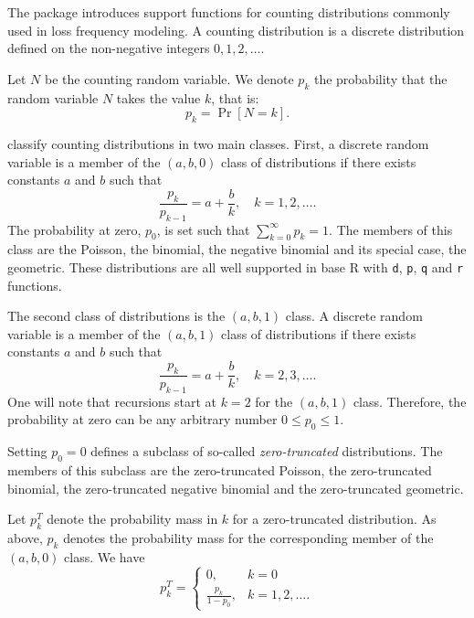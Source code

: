 \documentclass[x11names]{article}
\newcommand{\proglang}[1]{\textsf{#1}}
\newcommand{\code}[1]{\texttt{#1}}
\begin{document}
The package introduces support functions for counting distributions
commonly used in loss frequency modeling. A counting distribution is a
discrete distribution defined on the non-negative integers
$0, 1, 2, \dots$.

Let $N$ be the counting random variable. We denote $p_k$ the
probability that the random variable $N$ takes the value $k$, that is:
\begin{equation*}
  p_k = \Pr[N = k].
\end{equation*}

\citet{LossModels4e} classify counting distributions in two main
classes. First, a discrete random variable is a member of the
$(a, b, 0)$ class of distributions if there exists constants $a$ and
$b$ such that
\begin{equation*}
  \frac{p_k}{p_{k - 1}} = a + \frac{b}{k}, \quad k = 1, 2, \dots.
\end{equation*}
The probability at zero, $p_0$, is set such that
$\sum_{k = 0}^\infty p_k = 1$. The members of this class are the
Poisson, the binomial, the negative binomial and its special case, the
geometric. These distributions are all well supported in base
\proglang{R} with \code{d}, \code{p}, \code{q} and \code{r} functions.

The second class of distributions is the $(a, b, 1)$ class. A discrete
random variable is a member of the $(a, b, 1)$ class of distributions
if there exists constants $a$ and $b$ such that
\begin{equation*}
  \frac{p_k}{p_{k - 1}} = a + \frac{b}{k}, \quad k = 2, 3, \dots.
\end{equation*}
One will note that recursions start at $k = 2$ for the $(a, b, 1)$
class. Therefore, the probability at zero can be any arbitrary number
$0 \leq p_0 \leq 1$.

Setting $p_0 = 0$ defines a subclass of so-called
\emph{zero-truncated} distributions. The members of this subclass are
the zero-truncated Poisson, the zero-truncated binomial, the
zero-truncated negative binomial and the zero-truncated geometric.

Let $p_k^T$ denote the probability mass in $k$ for a zero-truncated
distribution. As above, $p_k$ denotes the probability mass for the
corresponding member of the $(a, b, 0)$ class. We have
\begin{equation*}
  p_k^T =
  \begin{cases}
    0, & k = 0 \\
    \displaystyle\frac{p_k}{1 - p_0}, & k = 1, 2, \dots.
  \end{cases}
\end{equation*}
\end{document}
